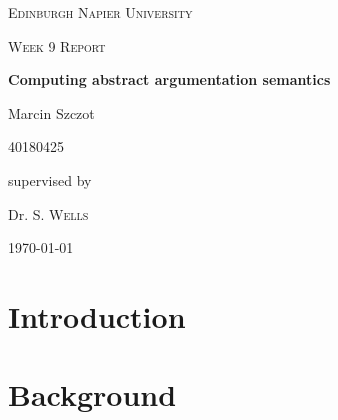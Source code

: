 \documentclass[12pt,a4paper]{report}
\theoremstyle{definition}
\begin{document}
\begin{titlepage}
	\centering
	{\scshape\LARGE Edinburgh Napier University \par}
	\vspace{1cm}
	{\scshape\Large Week 9 Report\par}
	\vspace{1.5cm}
	{\huge\bfseries Computing abstract argumentation semantics\par}
	\vspace{2cm}
	{\Large Marcin Szczot\par}
	{\Large 40180425\par}
	\vfill
	supervised by\par
	Dr. S. \textsc{Wells}

	\vfill

	{\large \today\par}
\end{titlepage}

\tableofcontents %
\newpage

\listoftables
\newpage

\listoffigures
\newpage


\newcommand{\software}{\textit{Alias}}

\chapter{Introduction}


\chapter{Background}
 
\end{document}
